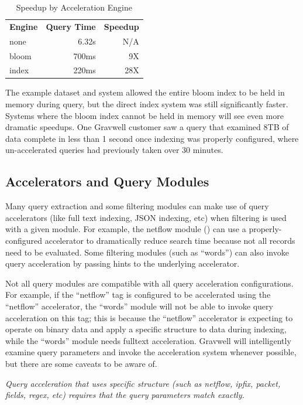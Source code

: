 {\begin{table}
\begin{tabular}{lrr}
	\hline
	\textbf{Engine} & \textbf{Query Time} & \textbf{Speedup} \\
	none & 6.32s & N/A \\
	bloom & 700ms & 9X \\
	index & 220ms & 28X \\
	\hline
\end{tabular}
\caption{Speedup by Acceleration Engine}
\label{table:accel-speedup}
\end{table}

The example dataset and system allowed the entire bloom index to be
held in memory during query, but the direct index system was still
significantly faster. Systems where the bloom index cannot be held in
memory will see even more dramatic speedups. One Gravwell customer saw
a query that examined 8TB of data complete in
less than 1 second once indexing was properly configured, where un-accelerated queries
had previously taken over 30 minutes.

\subsection{Accelerators and Query Modules}

Many query extraction and some filtering modules can make use of query accelerators (like full text indexing, JSON indexing, etc) when filtering is used with a given module. For example, the netflow module () can use a properly-configured accelerator to dramatically reduce search time because not all records need to be evaluated.  Some filtering modules (such as ``words'') can also invoke query acceleration by passing hints to the underlying accelerator.

Not all query modules are compatible with all query acceleration configurations.  For example, if the ``netflow'' tag is configured to be accelerated using the ``netflow'' accelerator, the ``words'' module will not be able to invoke query acceleration on this tag; this is because the ``netflow'' accelerator is expecting to operate on binary data and apply a specific structure to data during indexing, while the ``words'' module needs fulltext acceleration.  Gravwell will intelligently examine query parameters and invoke the acceleration system whenever possible, but there are some caveats to be aware of.

\textit{Query acceleration that uses specific structure (such as netflow, ipfix, packet, fields, regex, etc) requires that the query parameters match exactly.}

}
